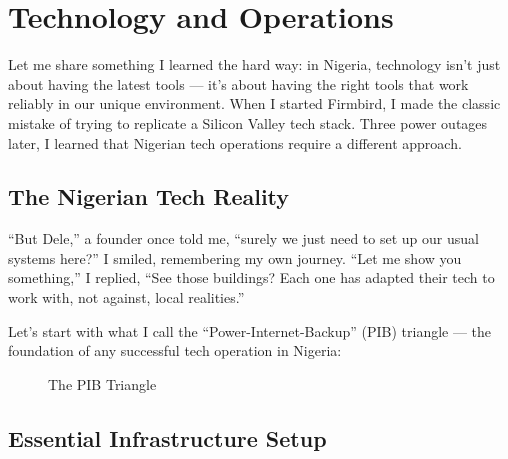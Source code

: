 \chapter{Technology and Operations}\label{ch:technology-and-operations}

\begin{importantbox}
Let me share something I learned the hard way: in Nigeria, technology isn't just about having the latest tools --- it's about having the right tools that work reliably in our unique environment. When I started Firmbird, I made the classic mistake of trying to replicate a Silicon Valley tech stack. Three power outages later, I learned that Nigerian tech operations require a different approach.
\end{importantbox}

\section{The Nigerian Tech Reality}\label{sec:nigerian-tech-reality}

``But Dele,'' a founder once told me, ``surely we just need to set up our usual systems here?'' I smiled, remembering my own journey. ``Let me show you something,'' I replied, ``See those buildings? Each one has adapted their tech to work with, not against, local realities.''

Let's start with what I call the ``Power-Internet-Backup'' (PIB) triangle --- the foundation of any successful tech operation in Nigeria:

\begin{figure}[h]
    \centering
    \caption{The PIB Triangle}
    \label{fig:pib-triangle}
\end{figure}

\section{Essential Infrastructure Setup}\label{sec:essential-infrastructure}


